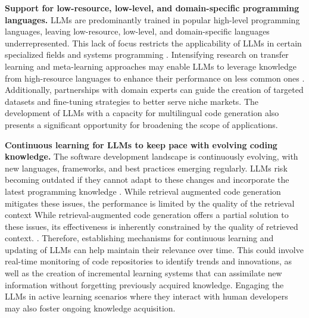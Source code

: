 \textbf{Support for low-resource, low-level, and domain-specific programming languages.}
LLMs are predominantly trained in popular high-level programming languages, leaving low-resource, low-level, and domain-specific languages underrepresented. This lack of focus restricts the applicability of LLMs in certain specialized fields and systems programming \cite{thakur2023benchmarking}.
Intensifying research on transfer learning and meta-learning approaches may enable LLMs to leverage knowledge from high-resource languages to enhance their performance on less common ones \cite{chen2022transferability,cassano2023knowledge}. 
Additionally, partnerships with domain experts can guide the creation of targeted datasets and fine-tuning strategies to better serve niche markets. The development of LLMs with a capacity for multilingual code generation also presents a significant opportunity for broadening the scope of applications.

\textbf{Continuous learning for LLMs to keep pace with evolving coding knowledge.}
The software development landscape is continuously evolving, with new languages, frameworks, and best practices emerging regularly. LLMs risk becoming outdated if they cannot adapt to these changes and incorporate the latest programming knowledge \cite{jang2022towards,wang2023knowledge}.
While retrieval augmented code generation mitigates these issues, the performance is limited by the quality of the retrieval context 
While retrieval-augmented code generation offers a partial solution to these issues, its effectiveness is inherently constrained by the quality of retrieved context.
\cite{lu2022reacc,zhou2022docprompting,zhang2023repocoder}. 
Therefore, establishing mechanisms for continuous learning and updating of LLMs can help maintain their relevance over time. This could involve real-time monitoring of code repositories to identify trends and innovations, as well as the creation of incremental learning systems that can assimilate new information without forgetting previously acquired knowledge. Engaging the LLMs in active learning scenarios where they interact with human developers may also foster ongoing knowledge acquisition.


